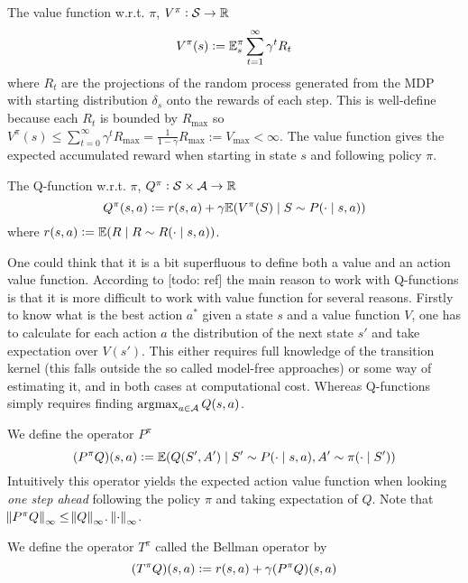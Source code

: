 The  value function
w.r.t. $\pi$,
$V^\pi : \mathcal{S} \to \mathbb{R}$
\[ V^\pi(s) \vcentcolon= \mathbb{E}^\pi_s \sum_{t = 1}^\infty \gamma^t R_t \]
where $R_t$ are the projections of the random process generated from the
MDP with starting distribution $\delta_s$ onto the rewards of each step.
This is well-define because each $R_t$ is bounded by $R_{\max}$ so
$V^{\pi}(s) \leq \sum_{t=0}^\infty \gamma^t R_{\max}
= \frac{1}{1-\gamma} R_{\max} := V_{\max} < \infty $.
The value function gives the expected 
accumulated reward when starting in state $s$ and following policy $\pi$.

The  Q-function 
w.r.t. $\pi$,
$Q^\pi : \mathcal{S} \times \mathcal{A} \to \mathbb{R}$
\[ Q^\pi(s, a) \vcentcolon= r(s, a) +
\gamma \mathbb{E} (V^\pi(S) \mid S \sim P(\cdot \mid s, a)) \]
where $r(s,a) \vcentcolon= \mathbb{E}(R \mid R \sim R(\cdot \mid s, a))$.

One could think that it is a bit superfluous to define both a value and an
action value function. 
According to [todo: ref] the main reason to work with Q-functions
is that it is more difficult to work with value function for several reasons.
Firstly to know what is the best action $a^*$ given a state $s$
and a value function $V$, one has to calculate for each action $a$
the distribution of the next state $s'$ and take expectation over
$V(s')$. This either requires full knowledge of the transition kernel
(this falls outside the so called model-free approaches)
or some way of estimating it, and in both cases at computational cost.
Whereas Q-functions simply requires finding
$\operatorname*{argmax}_{a \in \mathcal{A}} Q(s,a)$.

We define the operator $P^\pi$
\[ (P^\pi Q)(s, a) \vcentcolon= \mathbb{E} (Q(S', A') \mid S' \sim P(\cdot \mid s, a),
A' \sim \pi(\cdot \mid S')) \]
Intuitively this operator yields the expected action value function
when looking \emph{one step ahead} following the policy $\pi$ and taking
expectation of $Q$.
Note that $\norm{P^\pi Q}_\infty \leq \norm{Q}_\infty$.
$\norm{\cdot}_\infty$.

We define the operator $T^\pi$ called the Bellman operator by
\[ (T^\pi Q)(s, a) \vcentcolon= r(s, a) + \gamma (P^\pi Q)(s, a) \]

